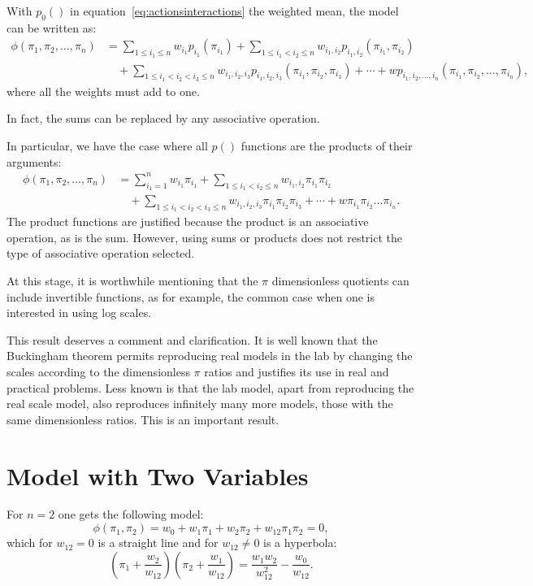 \documentclass[
	11pt, %
	fleqn, %
	a4paper, %
]{LegrandOrangeBook}
\begin{document}
With $p_0()$ in equation~\eqref{eq:actionsinteractions} the weighted mean, the model can be written as:
\begin{align}
\phi(\pi_1,\pi_2,\ldots,\pi_n) &= \sum_{1\leq i_1\leq n} w_{i_1}p_{i_1}(\pi_{i_1}) + \sum_{1\leq i_1<i_2\leq n} w_{i_1,i_2}p_{i_1,i_2}(\pi_{i_1},\pi_{i_2}) \\
&\quad + \sum_{1\leq i_1<i_2<i_3\leq n} w_{i_1,i_2,i_3}p_{i_1,i_2,i_3}(\pi_{i_1},\pi_{i_2},\pi_{i_3}) + \cdots + wp_{i_1,i_2,\ldots,i_n}(\pi_{i_1},\pi_{i_2},\ldots,\pi_{i_n}),
\end{align}
where all the weights must add to one.

In fact, the sums can be replaced by any associative operation.

In particular, we have the case where all $p()$ functions are the products of their arguments:
\begin{align}
\phi(\pi_1,\pi_2,\ldots,\pi_n) &= \sum_{i_1=1}^n w_{i_1}\pi_{i_1} + \sum_{1\leq i_1<i_2\leq n} w_{i_1,i_2}\pi_{i_1}\pi_{i_2} \nonumber\\
&\quad + \sum_{1\leq i_1<i_2<i_3\leq n} w_{i_1,i_2,i_3}\pi_{i_1}\pi_{i_2}\pi_{i_3} + \cdots + w\pi_{i_1}\pi_{i_2}\ldots\pi_{i_n}.
\label{eq:productinteractions}
\end{align}
The product functions are justified because the product is an associative operation, as is the sum. However, using sums or products does not restrict the type of associative operation selected.

At this stage, it is worthwhile mentioning that the $\pi$ dimensionless quotients can include invertible functions, as for example, the common case when one is interested in using log scales.

This result deserves a comment and clarification. It is well known that the Buckingham theorem permits reproducing real models in the lab by changing the scales according to the dimensionless $\pi$ ratios and justifies its use in real and practical problems. Less known is that the lab model, apart from reproducing the real scale model, also reproduces infinitely many more models, those with the same dimensionless ratios. This is an important result.
\section{Model with Two Variables}
For $n = 2$ one gets the following model:
\begin{equation}
\phi(\pi_1,\pi_2) = w_0 + w_1\pi_1 + w_2\pi_2 + w_{12}\pi_1\pi_2 = 0,
\label{eq:twovarmodel}
\end{equation}
which for $w_{12} = 0$ is a straight line and for $w_{12} \neq 0$ is a hyperbola:
\begin{equation}
\boxed{\left(\pi_1 + \frac{w_2}{w_{12}}\right)\left(\pi_2 + \frac{w_1}{w_{12}}\right) = \frac{w_1w_2}{w_{12}^2} - \frac{w_0}{w_{12}}.}
\end{equation}
\end{document}
